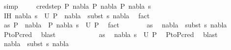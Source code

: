 \begin{isabellebody}
\ simp\ \isanewline
{}\isamarkupfalse%
\isanewline
\ \ \isamarkupfalse%
\ {\isacharparenleft}{\kern0pt}cred{\isacharunderscore}{\kern0pt}step\ P{}\ nabla{}\ P{}\ nabla{}\ P{}\ nabla{}\ s{}{\isacharparenright}{\kern0pt}\isanewline
\ \ \isamarkupfalse%
\ IH{\isacharcolon}{\kern0pt}\ {\isachardoublequoteopen}{\isacharparenleft}{\kern0pt}nabla{}{\isacharcomma}{\kern0pt}\ s{}{\isacharparenright}{\kern0pt}\ {\isasymin}\ U\ P{}\ {\isasymLongrightarrow}\ nabla{}\ {\isasymTurnstile}\ {\isacharparenleft}{\kern0pt}subst\ s{}{\isacharparenright}{\kern0pt}\ nabla{}{\isachardoublequoteclose}\ \isamarkupfalse%
\ fact\isanewline
\ \ \isamarkupfalse%
\ as{\isacharcolon}{\kern0pt}\ {\isachardoublequoteopen}P{}\ {\isasymturnstile}\ nabla{}\ {\isasymrightarrow}\ P{}{\isachardoublequoteclose}\ {\isachardoublequoteopen}{\isacharparenleft}{\kern0pt}nabla{}{\isacharcomma}{\kern0pt}\ s{}{\isacharparenright}{\kern0pt}\ {\isasymin}\ U\ P{}{\isachardoublequoteclose}\ \isamarkupfalse%
\ fact{\isacharplus}{\kern0pt}\ \isanewline
\ \ \isanewline
\ \ \isamarkupfalse%
\ as\ \isamarkupfalse%
\ {\isachardoublequoteopen}nabla{}\ {\isasymTurnstile}\ {\isacharparenleft}{\kern0pt}subst\ s{}{\isacharparenright}{\kern0pt}\ nabla{}{\isachardoublequoteclose}\ \isamarkupfalse%
\ P{}{\isacharunderscore}{\kern0pt}to{\isacharunderscore}{\kern0pt}P{}{\isacharunderscore}{\kern0pt}cred\ \isamarkupfalse%
\ blast\ \ \ \ \isanewline
\ \ \isamarkupfalse%
\ \isanewline
\ \ \isamarkupfalse%
\ as\ \isamarkupfalse%
\ {\isachardoublequoteopen}{\isacharparenleft}{\kern0pt}nabla{}{\isacharcomma}{\kern0pt}\ s{}{\isacharparenright}{\kern0pt}\ {\isasymin}\ U\ P{}{\isachardoublequoteclose}\ \isamarkupfalse%
\ P{}{\isacharunderscore}{\kern0pt}to{\isacharunderscore}{\kern0pt}P{}{\isacharunderscore}{\kern0pt}cred\ \isamarkupfalse%
\ blast\ \isanewline
\ \ \isamarkupfalse%
\ \isamarkupfalse%
\ {\isachardoublequoteopen}nabla{}\ {\isasymTurnstile}\ {\isacharparenleft}{\kern0pt}subst\ s{}{\isacharparenright}{\kern0pt}\ nabla{}{\isachardoublequoteclose}\ \isamarkupfalse%

\end{isabellebody}
